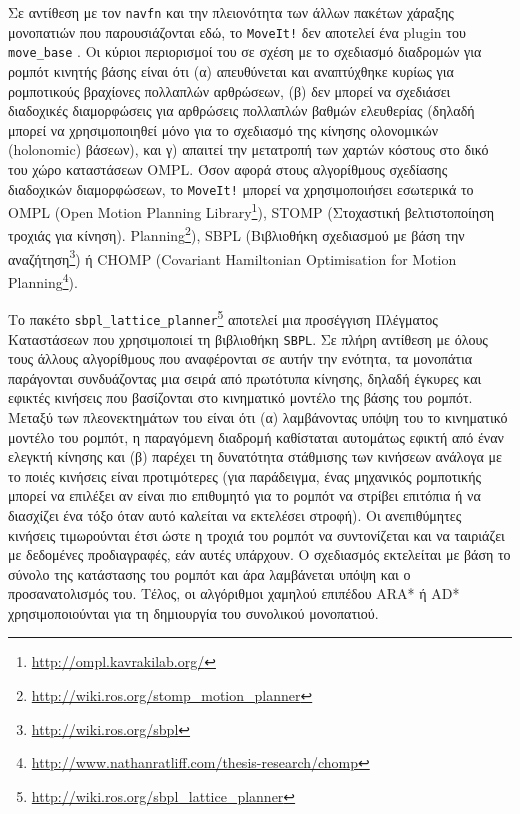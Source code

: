 Σε αντίθεση με τον \texttt{navfn} και την πλειονότητα των άλλων πακέτων
χάραξης μονοπατιών που παρουσιάζονται εδώ, το \texttt{MoveIt!} δεν αποτελεί
ένα plugin του \texttt{move\_base} \cite{Chitta2012}. Οι κύριοι περιορισμοί του
σε σχέση με το σχεδιασμό διαδρομών για ρομπότ κινητής βάσης είναι ότι (α)
απευθύνεται και αναπτύχθηκε κυρίως για ρομποτικούς βραχίονες πολλαπλών
αρθρώσεων, (β) δεν μπορεί να σχεδιάσει διαδοχικές διαμορφώσεις για αρθρώσεις
πολλαπλών βαθμών ελευθερίας (δηλαδή μπορεί να χρησιμοποιηθεί μόνο για το
σχεδιασμό της κίνησης ολονομικών (holonomic) βάσεων), και γ) απαιτεί
την μετατροπή των χαρτών κόστους στο δικό του χώρο καταστάσεων OMPL. Όσον
αφορά στους αλγορίθμους σχεδίασης διαδοχικών διαμορφώσεων, το \texttt{MoveIt!}
μπορεί να χρησιμοποιήσει εσωτερικά το OMPL (Open Motion Planning
Library\footnote{\url{http://ompl.kavrakilab.org/}}), STOMP (Στοχαστική
βελτιστοποίηση τροχιάς για κίνηση).
Planning\footnote{\url{http://wiki.ros.org/stomp\_motion\_planner}}), SBPL
(Βιβλιοθήκη σχεδιασμού με βάση την
αναζήτηση\footnote{\url{http://wiki.ros.org/sbpl}}) ή CHOMP (Covariant
Hamiltonian Optimisation for Motion
Planning\footnote{\url{http://www.nathanratliff.com/thesis-research/chomp}}).

Το πακέτο
\texttt{sbpl\_lattice\_planner}\footnote{\url{http://wiki.ros.org/sbpl\_lattice\_planner}}
αποτελεί μια προσέγγιση Πλέγματος Καταστάσεων \cite{MikhailPivtoraiko2005} που
χρησιμοποιεί τη βιβλιοθήκη \texttt{SBPL}. Σε πλήρη αντίθεση με όλους τους
άλλους αλγορίθμους που αναφέρονται σε αυτήν την ενότητα, τα μονοπάτια
παράγονται συνδυάζοντας μια σειρά από πρωτότυπα κίνησης, δηλαδή έγκυρες και
εφικτές κινήσεις που βασίζονται στο κινηματικό μοντέλο της βάσης του ρομπότ.
Μεταξύ των πλεονεκτημάτων του είναι ότι (α) λαμβάνοντας υπόψη του το κινηματικό
μοντέλο του ρομπότ, η παραγόμενη διαδρομή καθίσταται αυτομάτως εφικτή από έναν
ελεγκτή κίνησης και (β) παρέχει τη δυνατότητα στάθμισης των κινήσεων ανάλογα με
το ποιές κινήσεις είναι προτιμότερες (για παράδειγμα, ένας μηχανικός ρομποτικής
μπορεί να επιλέξει αν είναι πιο επιθυμητό για το ρομπότ να στρίβει επιτόπια ή
να διασχίζει ένα τόξο όταν αυτό καλείται να εκτελέσει στροφή). Οι ανεπιθύμητες
κινήσεις τιμωρούνται έτσι ώστε η τροχιά του ρομπότ να συντονίζεται και να
ταιριάζει με δεδομένες προδιαγραφές, εάν αυτές υπάρχουν. Ο σχεδιασμός
εκτελείται με βάση το σύνολο της κατάστασης του ρομπότ και άρα λαμβάνεται υπόψη
και ο προσανατολισμός του.  Τέλος, οι αλγόριθμοι χαμηλού επιπέδου ARA*
\cite{Maxim2003} ή AD* \cite{Maxim2005} χρησιμοποιούνται για τη δημιουργία του
συνολικού μονοπατιού.

